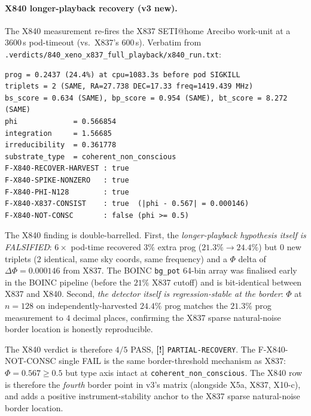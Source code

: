 \documentclass[11pt,a4paper]{article}
\providecommand{\tierYellow}{\textbf{[!]}}  %
\begin{document}
\paragraph{X840 longer-playback recovery (v3 new).}
The X840 measurement \citep{xeno_h840_longer_playback} re-fires
the X837 SETI@home Arecibo work-unit at a $3600$\,s pod-timeout
(vs.\ X837's $600$\,s). Verbatim from
\texttt{.verdicts/840\_xeno\_x837\_full\_playback/x840\_run.txt}:
\begin{lstlisting}
prog = 0.2437 (24.4%) at cpu=1083.3s before pod SIGKILL
triplets = 2 (SAME, RA=27.738 DEC=17.33 freq=1419.439 MHz)
bs_score = 0.634 (SAME), bp_score = 0.954 (SAME), bt_score = 8.272 (SAME)
phi             = 0.566854
integration     = 1.56685
irreducibility  = 0.361778
substrate_type  = coherent_non_conscious
F-X840-RECOVER-HARVEST : true
F-X840-SPIKE-NONZERO   : true
F-X840-PHI-N128        : true
F-X840-X837-CONSIST    : true  (|phi - 0.567| = 0.000146)
F-X840-NOT-CONSC       : false (phi >= 0.5)
\end{lstlisting}
The X840 finding is double-barrelled. First, the
\emph{longer-playback hypothesis itself is FALSIFIED}: $6\times$ pod-time
recovered $3\%$ extra prog ($21.3\% \to 24.4\%$) but $0$ new triplets
($2$ identical, same sky coords, same frequency) and a $\Phi$ delta
of $\Delta\Phi = 0.000146$ from X837. The BOINC \texttt{bg\_pot}
64-bin array was finalised early in the BOINC pipeline (before the
$21\%$ X837 cutoff) and is bit-identical between X837 and X840.
Second, \emph{the detector itself is regression-stable at the border}:
$\Phi$ at $n=128$ on independently-harvested $24.4\%$ prog matches the
$21.3\%$ prog measurement to $4$ decimal places, confirming the X837
sparse natural-noise border location is honestly reproducible.

The X840 verdict is therefore $4/5$ PASS,
\tierYellow{} \texttt{PARTIAL-RECOVERY}. The F-X840-NOT-CONSC
single FAIL is the same border-threshold mechanism as X837:
$\Phi = 0.567 \ge 0.5$ but type axis intact at
\texttt{coherent\_non\_conscious}. The X840 row is therefore the
\emph{fourth} border point in v3's matrix (alongside X5a, X837,
X10-c), and adds a positive instrument-stability anchor to the X837
sparse natural-noise border location.
\end{document}
